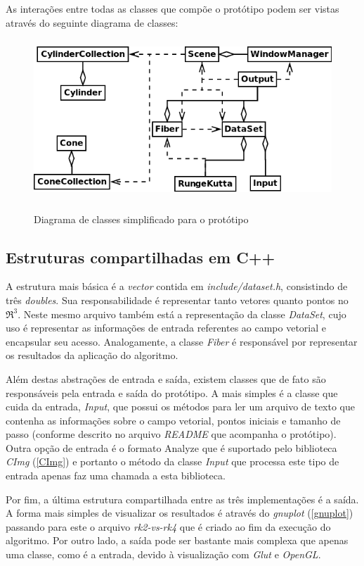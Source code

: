 \newpage
As interações entre todas as classes que compõe o protótipo podem ser vistas através do seguinte diagrama de classes:
\begin{figure}[!h]
  \begin{center}
    \includegraphics[width=120mm, height=60mm]{images/diagramadeclasse.png}
    \label{fig:diagramadeclasse}
    \caption{Diagrama de classes simplificado para o protótipo}
  \end{center}
\end{figure}

  \subsection{Estruturas compartilhadas em C++}
  A estrutura mais básica é a \textit{vector} contida em \textit{include/dataset.h}, consistindo de três \textit{doubles}. Sua responsabilidade é representar tanto vetores quanto pontos no $\Re ^{3}$. Neste mesmo arquivo também está a representação da classe \textit{DataSet}, cujo uso é representar as informações de entrada referentes ao campo vetorial e encapsular seu acesso. Analogamente, a classe \textit{Fiber} é responsável por representar os resultados da aplicação do algoritmo.
  
  Além destas abstrações de entrada e saída, existem classes que de fato são responsáveis pela entrada e saída do protótipo. A mais simples é a classe que cuida da entrada, \textit{Input}, que possui os métodos para ler um arquivo de texto que contenha as informações sobre o campo vetorial, pontos iniciais e tamanho de passo (conforme descrito no arquivo \textit{README} que acompanha o protótipo). Outra opção de entrada é o formato Analyze que é suportado pelo biblioteca \textit{CImg} (\ref{CImg}) e portanto o método da classe \textit{Input} que processa este tipo de entrada apenas faz uma chamada a esta biblioteca.
  
  Por fim, a última estrutura compartilhada entre as três implementações é a saída. A forma mais simples de visualizar os resultados é através do \textit{gnuplot} (\ref{gnuplot}) passando para este o arquivo \textit{rk2-vs-rk4} que é criado ao fim da execução do algoritmo. Por outro lado, a saída pode ser bastante mais complexa que apenas uma classe, como é a entrada, devido à visualização com \textit{Glut} e \textit{OpenGL}.
  
